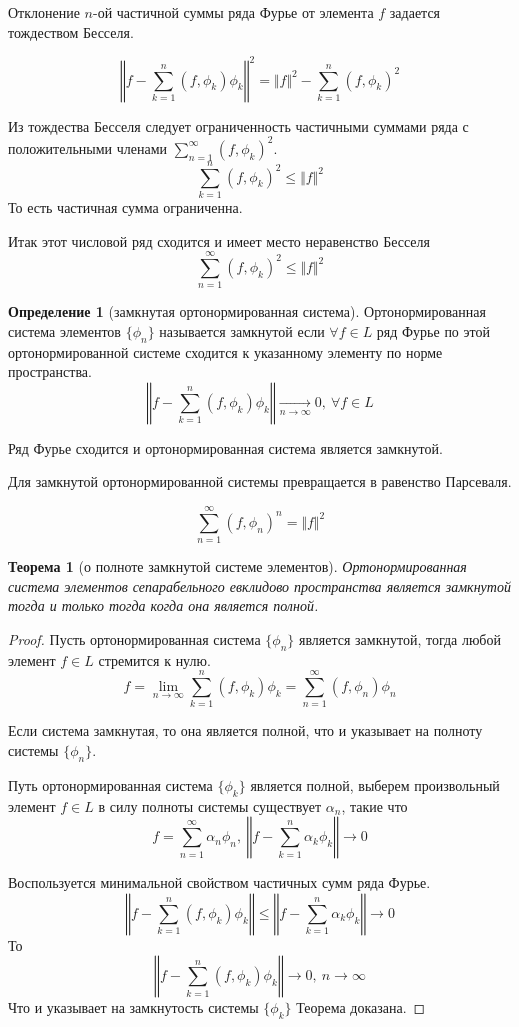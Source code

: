 \documentclass[14pt,a4paper]{extarticle}
\newtheorem{theorem}{Теорема}[section]
\theoremstyle{definition}
\newtheorem{definition}{Определение}[section]
\theoremstyle{remark}
\renewcommand{\[}{\begin{dmath*}[compact]}
\renewcommand{\]}{\end{dmath*}}
\newcommand{\sep}{ , \ \allowbreak }
\begin{document}
Отклонение $n$-ой частичной суммы ряда Фурье от элемента $f$ задается
тождеством Бесселя.

\[\left \Vert f - \sum_{k=1}^n (f,\phi_k) \phi_k \right \Vert ^ 2
= \Vert f \Vert ^ 2 - \sum_{k=1}^n(f,\phi_k)^2 \]

Из тождества Бесселя следует ограниченность частичными
суммами ряда с положительными членами $\sum_{n=1}^\infty (f,\phi_k)^2$.
\[\sum_{k=1}^n (f,\phi_k)^2 \leq \Vert f \Vert ^2 \]
То есть частичная сумма ограниченна.

Итак этот числовой ряд сходится и имеет место неравенство Бесселя
\[\sum_{n=1}^\infty (f,\phi_k)^2 \leq \Vert f \Vert ^2\]

\begin{definition}[замкнутая ортонормированная система]
  Ортонормированная система элементов $\{\phi_n\}$ называется замкнутой если
  $\forall f \in L$ ряд Фурье по этой ортонормированной системе сходится
  к указанному элементу по норме пространства.
  \[\left \Vert f - \sum_{k=1}^n (f,\phi_k) \phi_k \right \Vert
  \xrightarrow[n \to \infty]{} 0 \sep \forall f\in L\]
\end{definition}

Ряд Фурье сходится и ортонормированная система является замкнутой.

Для замкнутой ортонормированной системы превращается в равенство Пар\-се\-валя.

\[\sum_{n=1}^\infty (f, \phi_n)^n = \Vert f \Vert ^2\]

\begin{theorem}[о полноте замкнутой системе элементов]
  Ортонормированная система элементов сепарабельного евклидово пространства
  является замкнутой тогда и только тогда когда она является полной.
\end{theorem}

\begin{proof}
Пусть ортонормированная система $\{\phi_n\}$ является замкнутой,
тогда любой элемент $f \in L$ стремится к нулю.
\[f = \lim_{n \to \infty} \sum_{k=1}^n (f, \phi_k) \phi_k
= \sum_{n=1}^\infty (f,\phi_n) \phi_n\]

Если система замкнутая, то она является полной,
что и указывает на полноту системы $\{\phi_n\}$.

Путь ортонормированная система $\{\phi_k\}$ является полной,
выберем произвольный элемент $f \in L$ в силу полноты системы
существует $\alpha_n$, такие что
\[f = \sum_{n=1}^\infty \alpha_n \phi_n \sep
\left \Vert f - \sum_{k=1}^n \alpha_k \phi_k \right \Vert \to 0 \]

Воспользуется минимальной свойством частичных сумм ряда Фурье.
\[ \left\Vert f - \sum_{k=1}^n (f,\phi_k) \phi_k \right\Vert
\leq \left\Vert f - \sum_{k=1}^n \alpha_k \phi_k \right\Vert \to 0 \]
То
\[\left\Vert f - \sum_{k=1}^n (f,\phi_k) \phi_k \right\Vert \to 0 \sep
{n \to \infty}\]
Что и указывает на замкнутость системы $\{\phi_k\}$
Теорема доказана.
\end{proof}
\end{document}
